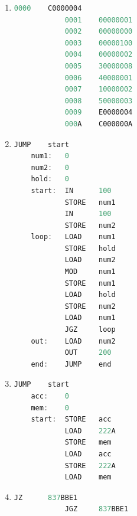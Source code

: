 \documentclass[12pt,letterpaper]{article}
\begin{document}
\begin{enumerate}
        \item %
        	\begin{lstlisting}[language=C, caption={0 - 255}]
		    0000	C0000004
    		0001	00000001 
    		0002	00000000 
    		0003	00000100 
    	    0004	00000002 
    		0005	30000008 
            0006	40000001 
            0007	10000002 
            0008 	50000003 
            0009	E0000004 
    		000A	C000000A 
            \end{lstlisting}
            
        \item %
        	\begin{lstlisting}[language=C, caption={GCD}]
            JUMP	start
    num1:	0
    num2:	0
    hold:	0
    start:  IN		100
    		STORE	num1
            IN		100
            STORE	num2
	loop:	LOAD	num1
    		STORE	hold
    		LOAD	num2
    		MOD		num1
            STORE	num1
            LOAD	hold
            STORE	num2
            LOAD	num1
            JGZ		loop
    out:	LOAD	num2
    		OUT		200
    end:	JUMP	end
            \end{lstlisting}
            
        \item %
        	\begin{lstlisting}[language=C, caption={Swap Accumulator and 0x222A}]
            JUMP	start
    acc:	0
    mem:	0
    start:  STORE	acc
    		LOAD	222A
            STORE	mem
            LOAD	acc
            STORE	222A
            LOAD	mem
            \end{lstlisting}
            
        \item %
        	\begin{lstlisting}[language=C, caption={Jump}]
            JZ		837BBE1
            JGZ		837BBE1
            \end{lstlisting}
        
    \end{enumerate}
    
\end{document}
